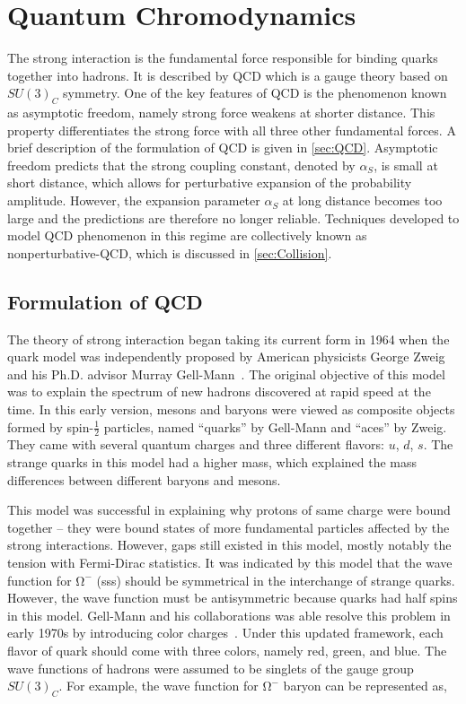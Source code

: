 \chapter{Quantum Chromodynamics}
\label{chap:QCD}

The strong interaction is the fundamental force responsible for binding quarks together into hadrons. It is described by \ac{QCD} which is a gauge theory based on $SU(3)_{C}$ symmetry. One of the key features of \ac{QCD} is the phenomenon known as asymptotic freedom, namely strong force weakens at shorter distance. This property differentiates the strong force with all three other fundamental forces. A brief description of the formulation of \ac{QCD} is given in \autoref{sec:QCD}. Asymptotic freedom predicts that the strong coupling constant, denoted by $\alpha_{S}$, is small at short distance, which allows for perturbative expansion of the probability amplitude. However, the expansion parameter $\alpha_{S}$ at long distance becomes too large and the predictions are therefore no longer reliable. Techniques developed to model \ac{QCD} phenomenon in this regime are collectively known as nonperturbative-\ac{QCD}, which is discussed in \autoref{sec:Collision}.

\section{Formulation of QCD}
\label{sec:QCD}

The theory of strong interaction began taking its current form in 1964 when the quark model was independently proposed by American physicists George Zweig~\cite{Zweig:1964ruk} and his Ph.D. advisor Murray Gell-Mann~\cite{Gell-Mann:1964ewy}. The original objective of this model was to explain the spectrum of new hadrons discovered at rapid speed at the time. In this early version, mesons and baryons were viewed as composite objects formed by spin-$\frac{1}{2}$ particles, named ``quarks'' by Gell-Mann and ``aces'' by Zweig. They came with several quantum charges and three different flavors: $u$, $d$, $s$. The strange quarks in this model had a higher mass, which explained the mass differences between different baryons and mesons.

This model was successful in explaining why protons of same charge were bound together -- they were bound states of more fundamental particles affected by the strong interactions. However, gaps still existed in this model, mostly notably the tension with Fermi-Dirac statistics. It was indicated by this model that the wave function for $\mathrm{\Omega^{-}}$ (sss) should be symmetrical in the interchange of strange quarks. However, the wave function must be antisymmetric because quarks had half spins in this model. Gell-Mann and his collaborations was able resolve this problem in early 1970s by introducing color charges~\cite{Fritzsch:1973pi}. Under this updated framework, each flavor of quark should come with three colors, namely red, green, and blue. The wave functions of hadrons were assumed to be singlets of the gauge group $SU(3)_{C}$. For example, the wave function for $\mathrm{\Omega^{-}}$ baryon can be represented as,

